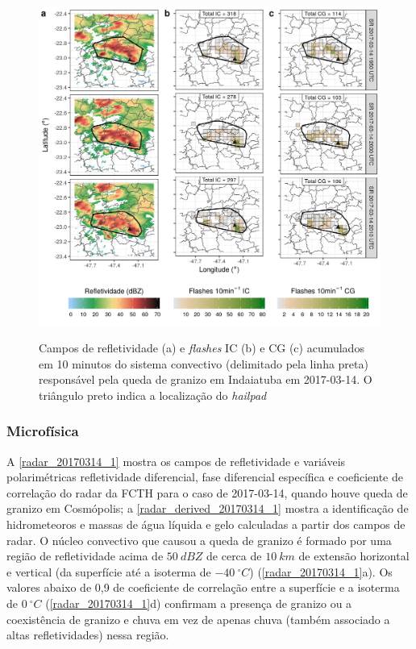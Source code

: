 \begin{figure}[htb]
	\centering
	\caption{Campos de refletividade (a) e \textit{flashes} IC (b) e CG (c) acumulados em 10 minutos do sistema convectivo (delimitado pela linha preta) responsável pela queda de granizo em Indaiatuba em 2017-03-14. O triângulo preto indica a localização do \textit{hailpad}} 
	\label{dbz_flashes_20170314_2}
	\includegraphics[width=0.99\columnwidth]{../General_Processing/figures/clusters_flashes_2017-03-14_2000_ptbr.png} \\
\end{figure}

\subsubsection{Microfísica}\label{micro_201703014}

A \autoref{radar_20170314_1} mostra os campos de refletividade e variáveis polarimétricas refletividade diferencial, fase diferencial específica e coeficiente de correlação do radar da FCTH para o caso de 2017-03-14, quando houve queda de granizo em Cosmópolis; a \autoref{radar_derived_20170314_1} mostra a identificação de hidrometeoros e massas de água líquida e gelo calculadas a partir dos campos de radar. O núcleo convectivo que causou a queda de granizo é formado por uma região de refletividade acima de $50\:dBZ$ de cerca de $10\:km$ de extensão horizontal e vertical (da superfície até a isoterma de $-40\:^{\circ}C$) (\autoref{radar_20170314_1}a). Os valores abaixo de 0,9 de coeficiente de correlação entre a superfície e a isoterma de $0\:^{\circ}C$ (\autoref{radar_20170314_1}d) confirmam a presença de granizo ou a coexistência de granizo e chuva em vez de apenas chuva (também associado a altas refletividades) nessa região.

